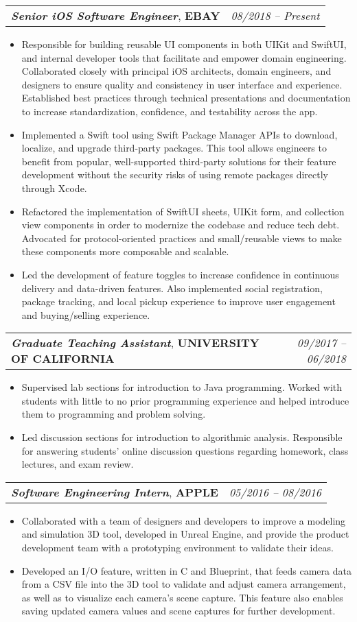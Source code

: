 \documentclass[letterpaper,11pt]{article}
\makeatletter
\newcommand{\resumeItem}[1]{
  \item \small{#1}
}
\newcommand{\resumeExperienceSubheading}[3]{
  \vspace{-1pt}\item
    \begin{tabular*}{0.97\textwidth}[t]{l@{\extracolsep{\fill}}r}
      \textbf{\textit{#1}}, \textbf{#2} & \textit{#3} \\
    \end{tabular*}\vspace{-5pt}
}
\newcommand{\resumeItemListStart}{\begin{itemize}}
\newcommand{\resumeItemListEnd}{\end{itemize}\vspace{-5pt}}
\def\CPlusPlus{{C\nolinebreak[4]\hspace{-.05em}\raisebox{.4ex}{\tiny\bf ++}}}
\makeatother
\begin{document}
    \resumeExperienceSubheading
      {Senior iOS Software Engineer}{EBAY}{08/2018 -- Present}
      \resumeItemListStart
        \resumeItem
          {Responsible for building reusable UI components in both UIKit and SwiftUI, and internal developer tools 
          that facilitate and empower domain engineering. Collaborated closely with principal iOS architects, domain engineers, and designers to ensure
          quality and consistency in user interface and experience. Established best practices through technical presentations 
          and documentation to increase standardization, confidence, and testability across the app.}
        \resumeItem
          {Implemented a Swift tool using Swift Package Manager APIs to download, localize, and upgrade third-party packages. 
          This tool allows engineers to benefit from popular, well-supported third-party solutions 
          for their feature development without the security risks of using remote packages directly through Xcode.}
        \resumeItem
          {Refactored the implementation of SwiftUI sheets, UIKit form, and collection view components
          in order to modernize the codebase and reduce tech debt. Advocated for protocol-oriented practices and 
          small/reusable views to make these components more composable and scalable.}
        \resumeItem
          {Led the development of feature toggles to increase confidence in continuous delivery and data-driven features. 
          Also implemented social registration, package tracking, and local pickup experience to improve user engagement and 
          buying/selling experience.}
      \resumeItemListEnd

    \resumeExperienceSubheading
      {Graduate Teaching Assistant}{UNIVERSITY OF CALIFORNIA}{09/2017 -- 06/2018}
      \resumeItemListStart
        \resumeItem
          {Supervised lab sections for introduction to Java programming. Worked with students with little to no prior programming
          experience and helped introduce them to programming and problem solving.}
        \resumeItem
          {Led discussion sections for introduction to algorithmic analysis. Responsible for answering students' online discussion
          questions regarding homework, class lectures, and exam review.}
      \resumeItemListEnd

      \resumeExperienceSubheading
      {Software Engineering Intern}{APPLE}{05/2016 -- 08/2016}
      \resumeItemListStart
        \resumeItem
          {Collaborated with a team of designers and developers to improve a modeling and simulation 3D tool, developed in
          Unreal Engine, and provide the product development team with a prototyping environment to validate their ideas.}
        \resumeItem
          {Developed an I/O feature, written in {\CPlusPlus} and Blueprint, that feeds camera data from a CSV file into the 3D tool to
          validate and adjust camera arrangement, as well as to visualize each camera's scene capture. This feature also enables saving
          updated camera values and scene captures for further development.}
      \resumeItemListEnd
\end{document}
